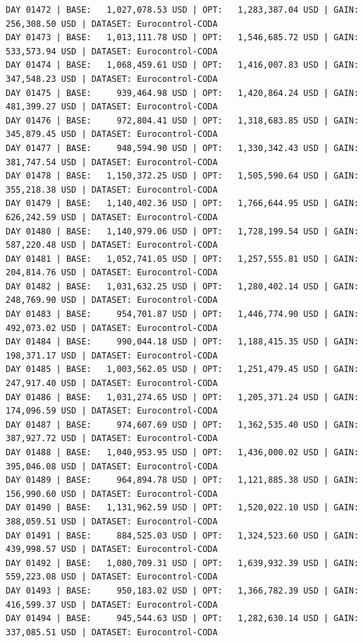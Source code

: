\documentclass[11pt,a4paper]{article}
\begin{document}
\begin{verbatim}
DAY 01472 | BASE:   1,027,078.53 USD | OPT:   1,283,387.04 USD | GAIN: 256,308.50 USD | DATASET: Eurocontrol-CODA
DAY 01473 | BASE:   1,013,111.78 USD | OPT:   1,546,685.72 USD | GAIN: 533,573.94 USD | DATASET: Eurocontrol-CODA
DAY 01474 | BASE:   1,068,459.61 USD | OPT:   1,416,007.83 USD | GAIN: 347,548.23 USD | DATASET: Eurocontrol-CODA
DAY 01475 | BASE:     939,464.98 USD | OPT:   1,420,864.24 USD | GAIN: 481,399.27 USD | DATASET: Eurocontrol-CODA
DAY 01476 | BASE:     972,804.41 USD | OPT:   1,318,683.85 USD | GAIN: 345,879.45 USD | DATASET: Eurocontrol-CODA
DAY 01477 | BASE:     948,594.90 USD | OPT:   1,330,342.43 USD | GAIN: 381,747.54 USD | DATASET: Eurocontrol-CODA
DAY 01478 | BASE:   1,150,372.25 USD | OPT:   1,505,590.64 USD | GAIN: 355,218.38 USD | DATASET: Eurocontrol-CODA
DAY 01479 | BASE:   1,140,402.36 USD | OPT:   1,766,644.95 USD | GAIN: 626,242.59 USD | DATASET: Eurocontrol-CODA
DAY 01480 | BASE:   1,140,979.06 USD | OPT:   1,728,199.54 USD | GAIN: 587,220.48 USD | DATASET: Eurocontrol-CODA
DAY 01481 | BASE:   1,052,741.05 USD | OPT:   1,257,555.81 USD | GAIN: 204,814.76 USD | DATASET: Eurocontrol-CODA
DAY 01482 | BASE:   1,031,632.25 USD | OPT:   1,280,402.14 USD | GAIN: 248,769.90 USD | DATASET: Eurocontrol-CODA
DAY 01483 | BASE:     954,701.87 USD | OPT:   1,446,774.90 USD | GAIN: 492,073.02 USD | DATASET: Eurocontrol-CODA
DAY 01484 | BASE:     990,044.18 USD | OPT:   1,188,415.35 USD | GAIN: 198,371.17 USD | DATASET: Eurocontrol-CODA
DAY 01485 | BASE:   1,003,562.05 USD | OPT:   1,251,479.45 USD | GAIN: 247,917.40 USD | DATASET: Eurocontrol-CODA
DAY 01486 | BASE:   1,031,274.65 USD | OPT:   1,205,371.24 USD | GAIN: 174,096.59 USD | DATASET: Eurocontrol-CODA
DAY 01487 | BASE:     974,607.69 USD | OPT:   1,362,535.40 USD | GAIN: 387,927.72 USD | DATASET: Eurocontrol-CODA
DAY 01488 | BASE:   1,040,953.95 USD | OPT:   1,436,000.02 USD | GAIN: 395,046.08 USD | DATASET: Eurocontrol-CODA
DAY 01489 | BASE:     964,894.78 USD | OPT:   1,121,885.38 USD | GAIN: 156,990.60 USD | DATASET: Eurocontrol-CODA
DAY 01490 | BASE:   1,131,962.59 USD | OPT:   1,520,022.10 USD | GAIN: 388,059.51 USD | DATASET: Eurocontrol-CODA
DAY 01491 | BASE:     884,525.03 USD | OPT:   1,324,523.60 USD | GAIN: 439,998.57 USD | DATASET: Eurocontrol-CODA
DAY 01492 | BASE:   1,080,709.31 USD | OPT:   1,639,932.39 USD | GAIN: 559,223.08 USD | DATASET: Eurocontrol-CODA
DAY 01493 | BASE:     950,183.02 USD | OPT:   1,366,782.39 USD | GAIN: 416,599.37 USD | DATASET: Eurocontrol-CODA
DAY 01494 | BASE:     945,544.63 USD | OPT:   1,282,630.14 USD | GAIN: 337,085.51 USD | DATASET: Eurocontrol-CODA

\end{verbatim}
\end{document}
